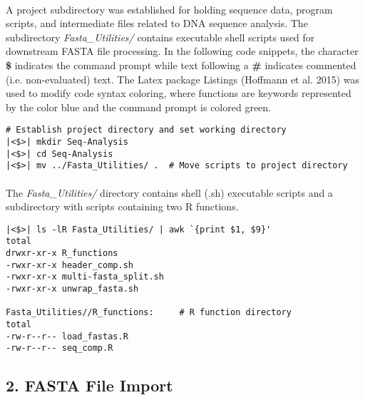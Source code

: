 \paragraph{} A project subdirectory was established for holding sequence data, program scripts, and intermediate files related to DNA sequence analysis.  The subdirectory \textit{Fasta\_Utilities/} contains executable shell scripts used for downstream FASTA file processing.  In the following code snippets, the character \textbf{\$} indicates the command prompt while text following a \textbf{\#} indicates commented (i.e. non-evaluated) text.  The Latex package Listings (Hoffmann et al. 2015) was used to modify code syntax coloring, where functions are keywords represented by the color blue and the command prompt is colored green.

\vspace*{30pt}

\begin{lstlisting}[caption={Project directory setup}]
# Establish project directory and set working directory
|<$>| mkdir Seq-Analysis
|<$>| cd Seq-Analysis
|<$>| mv ../Fasta_Utilities/ .  # Move scripts to project directory
\end{lstlisting}

\clearpage

\paragraph{} The \textit{Fasta\_Utilities/} directory contains shell (.sh) executable scripts and a subdirectory with scripts containing two R functions.

\vspace*{30pt}

\begin{lstlisting}[caption={Recursive list of \textit{Fasta\_Utilities/} subdirectory contents}]
|<$>| ls -lR Fasta_Utilities/ | awk `{print $1, $9}'
total 
drwxr-xr-x R_functions
-rwxr-xr-x header_comp.sh
-rwxr-xr-x multi-fasta_split.sh
-rwxr-xr-x unwrap_fasta.sh
 
Fasta_Utilities//R_functions:     # R function directory
total 
-rw-r--r-- load_fastas.R
-rw-r--r-- seq_comp.R

\end{lstlisting}

\vspace*{30pt}

\subsection*{2. FASTA File Import}

